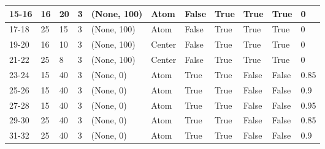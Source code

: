 \begin{longtable}{|C{0.9cm}|C{0.8cm}|C{0.8cm}|C{0.8cm}|C{3cm}|C{1.5cm}|C{1.5cm}|C{0.8cm}|C{0.8cm}|C{1cm}|C{1cm}|}
    15-16 &  16 &  20 &  3 & (None, 100) & Atom & False & True & True & True & 0 \\ \hline

    17-18 &  25 &  15 &  3 & (None, 100) & Atom & False & True & True & True & 0 \\ \hline

    19-20 &  16 &  10 &  3 & (None, 100) & Center & False & True & True & True & 0 \\ \hline

    21-22 &  25 &  8 &  3 & (None, 100) & Center & False & True & True & True & 0 \\ \hline

    23-24 &  15 &  40 &  3 & (None, 0) & Atom & True & True & False & False & 0.85 \\ \hline

    25-26 &  15 &  40 &  3 & (None, 0) & Atom & True & True & False & False & 0.9 \\ \hline

    27-28 &  15 &  40 &  3 & (None, 0) & Atom & True & True & False & False & 0.95 \\ \hline

    29-30 &  25 &  40 &  3 & (None, 0) & Atom & True & True & False & False & 0.85 \\ \hline

    31-32 &  25 &  40 &  3 & (None, 0) & Atom & True & True & False & False & 0.9 \\ \hline


\end{longtable}
